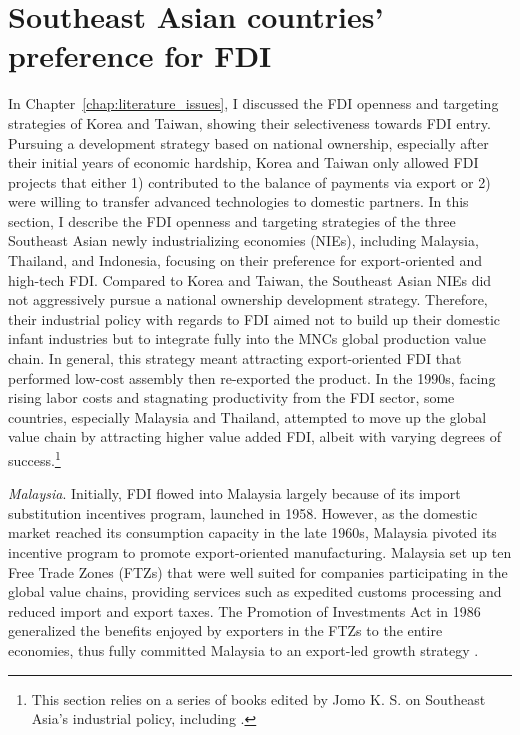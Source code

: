 \section{Southeast Asian countries' preference for FDI}
\label{sec:countries_preference}

In Chapter~\ref{chap:literature_issues}, I discussed the FDI openness and
targeting strategies of Korea and Taiwan, showing their selectiveness towards
FDI entry. Pursuing a development strategy based on national ownership,
especially after their initial years of economic hardship, Korea and Taiwan only
allowed FDI projects that either 1) contributed to the balance of payments via
export or 2) were willing to transfer advanced technologies to domestic
partners. In this section, I describe the FDI openness and targeting strategies
of the three Southeast Asian newly industrializing economies (NIEs), including
Malaysia, Thailand, and Indonesia, focusing on their preference for
export-oriented and high-tech FDI. Compared to Korea and Taiwan, the Southeast
Asian NIEs did not aggressively pursue a national ownership development
strategy. Therefore, their industrial policy with regards to FDI aimed not to
build up their domestic infant industries but to integrate fully into the MNCs
global production value chain. In general, this strategy meant attracting
export-oriented FDI that performed low-cost assembly then re-exported the
product. In the 1990s, facing rising labor costs and stagnating productivity
from the FDI sector, some countries, especially Malaysia and Thailand, attempted
to move up the global value chain by attracting higher value added FDI, albeit
with varying degrees of success.\footnote{This section relies on a series of
  books edited by Jomo K. S. on Southeast Asia's industrial policy, including
  \citet{Jomo1997, Jomo2001, Jomo2003}.}

\textit{Malaysia}. Initially, FDI flowed into Malaysia largely because of its
import substitution incentives program, launched in 1958. However, as the
domestic market reached its consumption capacity in the late 1960s, Malaysia
pivoted its incentive program to promote export-oriented manufacturing. Malaysia
set up ten Free Trade Zones (FTZs) that were well suited for companies
participating in the global value chains, providing services such as expedited
customs processing and reduced import and export taxes. The Promotion of
Investments Act in 1986 generalized the benefits enjoyed by exporters in the
FTZs to the entire economies, thus fully committed Malaysia to an export-led
growth strategy \citep[96-100]{Jomo2003}.

